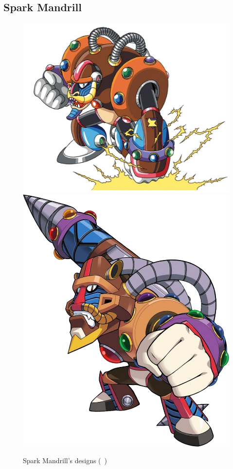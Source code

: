 \subsection{Spark Mandrill}\label{boss:Spark_mandrill}
\begin{figure}[htp]
	\centering
	\includegraphics[height=\portraitsize]{figures/X1/Spark_mandrill/SparkMandrill.jpg}
	\includegraphics[height=\portraitsize]{figures/X1/Spark_mandrill/MHXSparkMandrill.png}
	\caption{Spark Mandrill's designs (~\cite{book:MMX_Complete_art})}
\end{figure}

